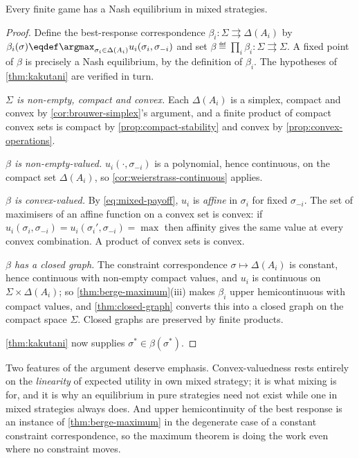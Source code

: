 \begin{theorem}[Nash]\label{thm:nash-existence}
	Every finite game has a Nash equilibrium in mixed strategies.
\end{theorem}

\begin{proof}
	Define the best-response correspondence
	$\beta_i\colon\Sigma\rightrightarrows\Delta(A_i)$ by
	$\beta_i(\sigma)\eqdef\argmax_{\sigma_i\in\Delta(A_i)}u_i(\sigma_i,\sigma_{-i})$
	and set $\beta\eqdef\prod_i\beta_i\colon\Sigma\rightrightarrows\Sigma$. A fixed
	point of $\beta$ is precisely a Nash equilibrium, by the definition of
	$\beta_i$. The hypotheses of \autoref{thm:kakutani} are verified in turn.

	\emph{$\Sigma$ is non-empty, compact and convex.} Each $\Delta(A_i)$ is a
	simplex, compact and convex by \autoref{cor:brouwer-simplex}'s argument, and a
	finite product of compact convex sets is compact by
	\autoref{prop:compact-stability} and convex by
	\autoref{prop:convex-operations}.

	\emph{$\beta$ is non-empty-valued.} $u_i(\cdot,\sigma_{-i})$ is a polynomial,
	hence continuous, on the compact set $\Delta(A_i)$, so
	\autoref{cor:weierstrass-continuous} applies.

	\emph{$\beta$ is convex-valued.} By \eqref{eq:mixed-payoff}, $u_i$ is
	\emph{affine} in $\sigma_i$ for fixed $\sigma_{-i}$. The set of maximisers of an
	affine function on a convex set is convex: if
	$u_i(\sigma_i,\sigma_{-i})=u_i(\sigma_i',\sigma_{-i})=\max$ then affinity gives
	the same value at every convex combination. A product of convex sets is convex.

	\emph{$\beta$ has a closed graph.} The constraint correspondence
	$\sigma\mapsto\Delta(A_i)$ is constant, hence continuous with non-empty compact
	values, and $u_i$ is continuous on $\Sigma\times\Delta(A_i)$; so
	\autoref{thm:berge-maximum}(iii) makes $\beta_i$ upper hemicontinuous with
	compact values, and \autoref{thm:closed-graph} converts this into a closed graph
	on the compact space $\Sigma$. Closed graphs are preserved by finite products.

	\autoref{thm:kakutani} now supplies $\sigma^{\ast}\in\beta(\sigma^{\ast})$.
\end{proof}

Two features of the argument deserve emphasis. Convex-valuedness rests entirely
on the \emph{linearity} of expected utility in own mixed strategy; it is what
mixing is for, and it is why an equilibrium in pure strategies need not exist
while one in mixed strategies always does. And upper hemicontinuity of the best
response is an instance of \autoref{thm:berge-maximum} in the degenerate case of
a constant constraint correspondence, so the maximum theorem is doing the work
even where no constraint moves.

